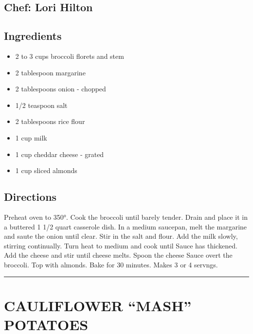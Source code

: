 \documentclass[
]{book}
\providecommand{\tightlist}{%
  \setlength{\itemsep}{0pt}\setlength{\parskip}{0pt}}
\begin{document}
\hypertarget{chef-lori-hilton-1}{%
\subsection*{Chef: Lori Hilton}\label{chef-lori-hilton-1}}


\hypertarget{ingredients-27}{%
\subsection*{Ingredients}\label{ingredients-27}}


\begin{itemize}
\tightlist
\item
  2 to 3 cups broccoli florets and stem
\item
  2 tablespoon margarine
\item
  2 tablespoons onion - chopped
\item
  1/2 teaspoon salt
\item
  2 tablespoons rice flour
\item
  1 cup milk
\item
  1 cup cheddar cheese - grated
\item
  1 cup sliced almonds
\end{itemize}

\hypertarget{directions-27}{%
\subsection*{Directions}\label{directions-27}}


Preheat oven to 350°. Cook the broccoli until barely tender. Drain and place it in a buttered 1 1/2 quart casserole dish. In a medium saucepan, melt the margarine and saute the onion until clear. Stir in the salt and flour. Add the milk slowly, stirring continually. Turn heat to medium and cook until Sauce has thickened. Add the cheese and stir until cheese melts. Spoon the cheese Sauce overt the broccoli. Top with almonds. Bake for 30 minutes. Makes 3 or 4 servngs.

\begin{center}\rule{0.5\linewidth}{0.5pt}\end{center}

\hypertarget{cauliflower-mash-potatoes}{%
\section*{CAULIFLOWER ``MASH'' POTATOES}\label{cauliflower-mash-potatoes}}
\end{document}
